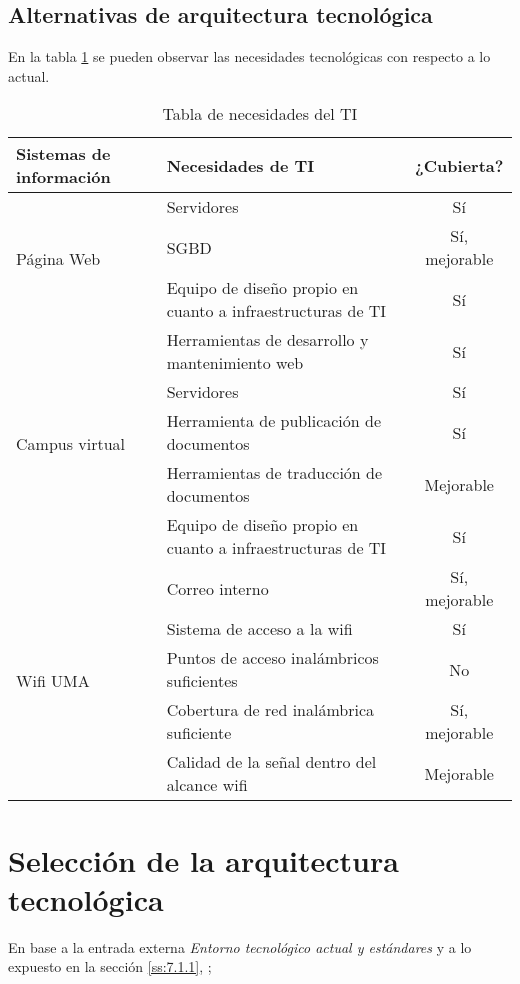 \documentclass[11pt,a4paper,spanish,twoside]{report}
\begin{document}
\subsection{Alternativas de arquitectura tecnológica} \label{ss:7.1.1}
En la tabla \ref{Tab:TabNec} se pueden observar las necesidades 
tecnológicas con respecto a lo actual.
\begin{table}[!h]
\centering
  \begin{tabular}{p{2.7cm}|p{5cm}|c}
    \textbf{Sistemas de información} & \textbf{Necesidades de TI} &
    \textbf{¿Cubierta?} \\
    \hline \hline
    \multirow{3}{4cm}{Página Web}
    & Servidores & Sí \\ \cline{2-3}
    & SGBD & Sí, mejorable \\ \cline{2-3}
    & Equipo de diseño propio en cuanto a infraestructuras de TI & Sí\\ 
    \cline{2-3}
    & Herramientas de desarrollo y mantenimiento web & Sí\\ \hline
    
    \multirow{3}{4cm}{Campus virtual}
    & Servidores & Sí\\ \cline{2-3}
    & Herramienta de publicación de documentos & Sí\\ \cline{2-3}
    & Herramientas de traducción de documentos & Mejorable\\ \cline{2-3}
    & Equipo de diseño propio en cuanto a infraestructuras de TI & Sí\\
    \cline{2-3}
    & Correo interno & Sí, mejorable\\ \hline
    
    \multirow{3}{4cm}{Wifi UMA}
    & Sistema de acceso a la wifi & Sí\\ \cline{2-3}
    & Puntos de acceso inalámbricos suficientes & No\\ \cline{2-3}
    & Cobertura de red inalámbrica suficiente & Sí, mejorable\\ \cline{2-3}
    & Calidad de la señal dentro del alcance wifi & Mejorable\\ \hline
    
  \end{tabular}
  \caption{Tabla de necesidades del TI} \label{Tab:TabNec}
\end{table}

\section{Selección de la arquitectura tecnológica}
En base a la entrada externa \emph{Entorno tecnológico actual y estándares} y
a lo expuesto 
en la sección \vref{ss:7.1.1}, \emph{}; 
\end{document}
